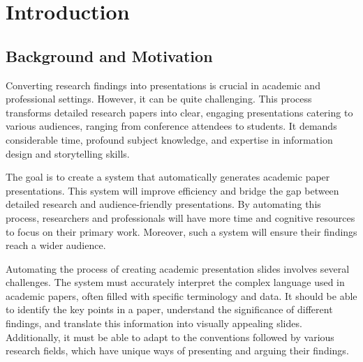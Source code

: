 
\chapter{Introduction}
\label{ch:intro}


\section{Background and Motivation}
\label{sec:intro:background}


Converting research findings into presentations is crucial in academic and professional settings. However, it can be quite challenging. This process transforms detailed research papers into clear, engaging presentations catering to various audiences, ranging from conference attendees to students. It demands considerable time, profound subject knowledge, and expertise in information design and storytelling skills.

The goal is to create a system that automatically generates academic paper presentations. This system will improve efficiency and bridge the gap between detailed research and audience-friendly presentations. By automating this process, researchers and professionals will have more time and cognitive resources to focus on their primary work. Moreover, such a system will ensure their findings reach a wider audience.

Automating the process of creating academic presentation slides involves several challenges. The system must accurately interpret the complex language used in academic papers, often filled with specific terminology and data. It should be able to identify the key points in a paper, understand the significance of different findings, and translate this information into visually appealing slides. Additionally, it must be able to adapt to the conventions followed by various research fields, which have unique ways of presenting and arguing their findings.

